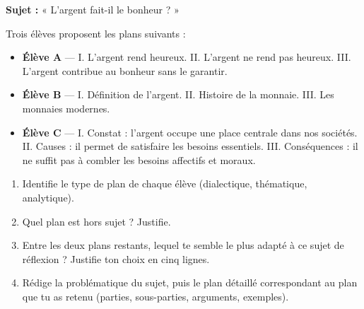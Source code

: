 \documentclass[11pt]{article}
\begin{document}
\begin{exercice}
\textbf{Sujet :} « L'argent fait-il le bonheur ? »

Trois élèves proposent les plans suivants :
\begin{itemize}
\item \textbf{Élève A} — I. L'argent rend heureux. II. L'argent ne rend pas heureux. III. L'argent contribue au bonheur sans le garantir.
\item \textbf{Élève B} — I. Définition de l'argent. II. Histoire de la monnaie. III. Les monnaies modernes.
\item \textbf{Élève C} — I. Constat : l'argent occupe une place centrale dans nos sociétés. II. Causes : il permet de satisfaire les besoins essentiels. III. Conséquences : il ne suffit pas à combler les besoins affectifs et moraux.
\end{itemize}

\begin{enumerate}
\item Identifie le type de plan de chaque élève (dialectique, thématique, analytique).
\item Quel plan est hors sujet ? Justifie.
\item Entre les deux plans restants, lequel te semble le plus adapté à ce sujet de réflexion ? Justifie ton choix en cinq lignes.
\item Rédige la problématique du sujet, puis le plan détaillé correspondant au plan que tu as retenu (parties, sous-parties, arguments, exemples).
\end{enumerate}
\end{exercice}
\end{document}
